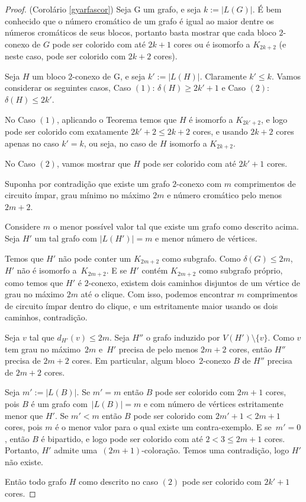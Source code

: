 \documentclass{article}
\begin{document}
\begin{proof}{(Corolário \ref{gyarfascor})}
Seja G um grafo, e seja $k := |L(G)|$. É bem conhecido que o número cromático de um grafo é igual ao maior dentre os números cromáticos de seus blocos, portanto basta mostrar que cada bloco $2$-conexo de $G$ pode ser colorido com até $2k+1$ cores ou é isomorfo a $K_{2k+2}$ (e neste caso, pode ser colorido com $2k+2$ cores).

Seja $H$ um bloco $2$-conexo de G, e seja $k' := |L(H)|$. Claramente $k' \leq k$. Vamos considerar os seguintes casos, Caso $(1)$: $\delta(H) \geq 2k'+1$ e Caso $(2)$: $\delta(H) \leq 2k'$.

No Caso $(1)$, aplicando o Teorema temos que $H$ é isomorfo a $K_{2k'+2}$, e logo pode ser colorido com exatamente $2k'+2\leq 2k+2$ cores, e usando $2k+2$ cores apenas no caso $k' = k$, ou seja, no caso de $H$  isomorfo a $K_{2k+2}$.

No Caso $(2)$, vamos mostrar que $H$ pode ser colorido com até $2k'+1$ cores.

Suponha por contradição que existe um grafo $2$-conexo com $m$ comprimentos de circuito ímpar, grau mínimo no máximo $2m$ e número cromático pelo menos $2m+2$.

Considere $m$ o menor possível valor tal que existe um grafo como descrito acima. Seja $H'$ um tal grafo com $|L(H')| = m$ e menor número de vértices.

Temos que $H'$ não pode conter um $K_{2m+2}$ como subgrafo. Como $\delta(G) \leq 2m$, $H'$ não é isomorfo a~$K_{2m+2}$. E se $H'$ contém $K_{2m+2}$ como subgrafo próprio, como temos que $H'$ é $2$-conexo, existem dois caminhos disjuntos de um vértice de grau no máximo $2m$ até o clique. Com isso, podemos encontrar $m$ comprimentos de circuito ímpar dentro do clique, e um estritamente maior usando os dois caminhos, contradição.

Seja $v$ tal que $d_{H'}(v) \le 2m$. Seja $H''$ o grafo induzido por $V(H') \setminus \{v\}$. Como $v$ tem grau no máximo~$2m$ e~$H'$ precisa de pelo menos $2m+2$ cores, então $H''$ precisa de $2m+2$ cores. Em particular, algum bloco~$2$-conexo $B$ de $H''$ precisa de $2m+2$ cores.

Seja $m' := |L(B)|$. Se $m' = m$ então $B$ pode ser colorido com $2m+1$ cores, pois $B$ é um grafo com~$|L(B)| = m$ e com número de vértices estritamente menor que $H'$. Se $m' < m$ então $B$ pode ser colorido com $2m'+1 < 2m+1$ cores, pois $m$ é o menor valor para o qual existe um contra-exemplo. E se~$m' = 0$, então $B$ é bipartido, e logo pode ser colorido com até $2 < 3 \leq 2m+1$ cores. Portanto, $H'$ admite uma~$(2m+1)$-coloração. Temos uma contradição, logo $H'$ não existe. 

Então todo grafo $H$ como descrito no caso $(2)$ pode ser colorido com $2k'+1$ cores.
\end{proof}
\end{document}
